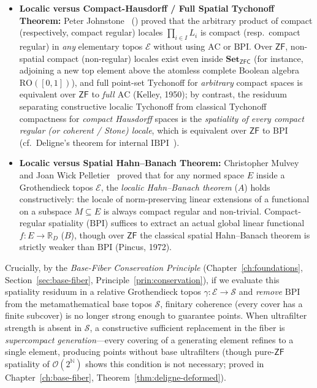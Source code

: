 \documentclass[10pt,twoside,openright]{book}
\theoremstyle{crmplain}
\theoremstyle{crmdef}
\theoremstyle{crmremark}
\begin{document}
\begin{itemize}[leftmargin=1.5em]

  \item \textbf{Localic versus Compact-Hausdorff / Full Spatial Tychonoff Theorem:} Peter Johnstone~\cite{Johnstone81} (\cite[Ch.~III, \S 1]{Johnstone82}) proved that the arbitrary product of compact (respectively, compact regular) locales $\prod_{i \in I} L_i$ is compact (resp.\ compact regular) in \emph{any} elementary topos $\mathcal{E}$ without using $\mathrm{AC}$ or $\mathrm{BPI}$. Over $\mathsf{ZF}$, non-spatial compact (non-regular) locales exist even inside $\mathbf{Set}_{\mathsf{ZFC}}$ (for instance, adjoining a new top element above the atomless complete Boolean algebra $\mathrm{RO}([0, 1])$), and full point-set Tychonoff for \emph{arbitrary} compact spaces is equivalent over $\mathsf{ZF}$ to \emph{full $\mathrm{AC}$} (Kelley, 1950); by contrast, the residuum separating constructive localic Tychonoff from classical Tychonoff compactness for \emph{compact Hausdorff} spaces is the \emph{spatiality of every compact regular (or coherent / Stone) locale}, which is equivalent over $\mathsf{ZF}$ to $\mathrm{BPI}$~\cite[III.1.10]{Johnstone82} (cf.\ Deligne's theorem for internal $\mathrm{IBPI}$~\cite[Exp.~VI, Appendice]{Deligne72}).

  \item \textbf{Localic versus Spatial Hahn--Banach Theorem:} Christopher Mulvey and Joan Wick Pelletier~\cite{MulveyPelletier91} proved that for any normed space $E$ inside a Grothendieck topos $\mathcal{E}$, the \emph{localic Hahn--Banach theorem} ($A$) holds constructively: the locale of norm-preserving linear extensions of a functional on a subspace $M \subseteq E$ is always compact regular and non-trivial. Compact-regular spatiality ($\mathrm{BPI}$) suffices to extract an actual global linear functional $f: E \to \mathbb{R}_D$ ($B$), though over $\mathsf{ZF}$ the classical spatial Hahn--Banach theorem is strictly weaker than $\mathrm{BPI}$ (Pincus, 1972).

\end{itemize}

Crucially, by the \emph{Base-Fiber Conservation Principle} (Chapter~\ref{ch:foundations}, Section~\ref{sec:base-fiber}, Principle~\ref{prin:conservation}), if we evaluate this spatiality residuum in a relative Grothendieck topos $\gamma: \mathcal{E} \to \mathcal{S}$ and \emph{remove} $\mathrm{BPI}$ from the metamathematical base topos $\mathcal{S}$, finitary coherence (every cover has a finite subcover) is no longer strong enough to guarantee points. When ultrafilter strength is absent in $\mathcal{S}$, a constructive sufficient replacement in the fiber is \emph{supercompact generation}---every covering of a generating element refines to a single element, producing points without base ultrafilters (though pure-$\mathsf{ZF}$ spatiality of $\mathcal{O}(2^{\mathbb{N}})$ shows this condition is not necessary; proved in Chapter~\ref{ch:base-fiber}, Theorem~\ref{thm:deligne-deformed}).
\end{document}
